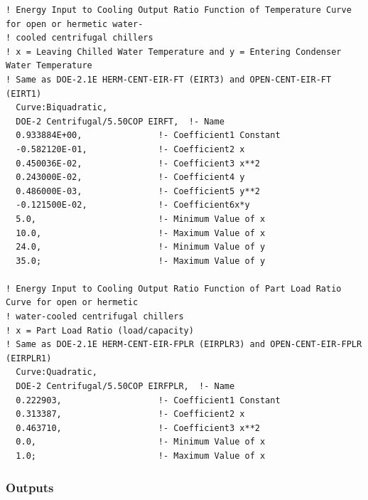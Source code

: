 \begin{lstlisting}
! Energy Input to Cooling Output Ratio Function of Temperature Curve for open or hermetic water-
! cooled centrifugal chillers
! x = Leaving Chilled Water Temperature and y = Entering Condenser Water Temperature
! Same as DOE-2.1E HERM-CENT-EIR-FT (EIRT3) and OPEN-CENT-EIR-FT (EIRT1)
  Curve:Biquadratic,
  DOE-2 Centrifugal/5.50COP EIRFT,  !- Name
  0.933884E+00,               !- Coefficient1 Constant
  -0.582120E-01,              !- Coefficient2 x
  0.450036E-02,               !- Coefficient3 x**2
  0.243000E-02,               !- Coefficient4 y
  0.486000E-03,               !- Coefficient5 y**2
  -0.121500E-02,              !- Coefficient6x*y
  5.0,                        !- Minimum Value of x
  10.0,                       !- Maximum Value of x
  24.0,                       !- Minimum Value of y
  35.0;                       !- Maximum Value of y

! Energy Input to Cooling Output Ratio Function of Part Load Ratio Curve for open or hermetic
! water-cooled centrifugal chillers
! x = Part Load Ratio (load/capacity)
! Same as DOE-2.1E HERM-CENT-EIR-FPLR (EIRPLR3) and OPEN-CENT-EIR-FPLR (EIRPLR1)
  Curve:Quadratic,
  DOE-2 Centrifugal/5.50COP EIRFPLR,  !- Name
  0.222903,                   !- Coefficient1 Constant
  0.313387,                   !- Coefficient2 x
  0.463710,                   !- Coefficient3 x**2
  0.0,                        !- Minimum Value of x
  1.0;                        !- Maximum Value of x
\end{lstlisting}

\subsubsection{Outputs}\label{outputs-4-010}

